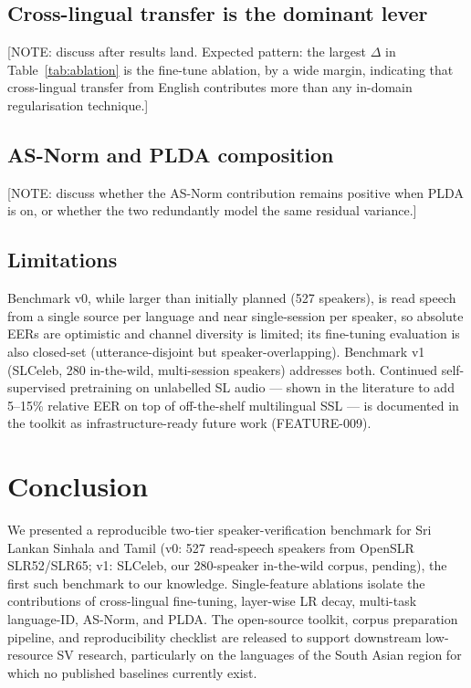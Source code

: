 \documentclass[11pt,a4paper]{article}
\begin{document}
\subsection{Cross-lingual transfer is the dominant lever}

[NOTE: discuss after results land. Expected pattern: the largest
$\Delta$ in Table~\ref{tab:ablation} is the fine-tune ablation, by
a wide margin, indicating that cross-lingual transfer from English
contributes more than any in-domain regularisation technique.]

\subsection{AS-Norm and PLDA composition}

[NOTE: discuss whether the AS-Norm contribution remains positive
when PLDA is on, or whether the two redundantly model the same
residual variance.]

\subsection{Limitations}

Benchmark v0, while larger than initially planned (527 speakers), is
read speech from a single source per language and near single-session
per speaker, so absolute EERs are optimistic and channel diversity is
limited; its fine-tuning evaluation is also closed-set
(utterance-disjoint but speaker-overlapping). Benchmark v1 (SLCeleb,
280 in-the-wild, multi-session speakers) addresses both. Continued self-supervised
pretraining on unlabelled SL audio --- shown in the literature to add
5--15\% relative EER on top of off-the-shelf multilingual SSL ---
is documented in the toolkit as infrastructure-ready future work
(FEATURE-009).

\section{Conclusion}
\label{sec:conclusion}

We presented a reproducible two-tier speaker-verification benchmark
for Sri Lankan Sinhala and Tamil (v0: 527 read-speech speakers from
OpenSLR SLR52/SLR65; v1: SLCeleb, our 280-speaker in-the-wild corpus,
pending), the first such benchmark to our knowledge. Single-feature ablations isolate the contributions of
cross-lingual fine-tuning, layer-wise LR decay, multi-task
language-ID, AS-Norm, and PLDA. The open-source toolkit, corpus
preparation pipeline, and reproducibility checklist are released to
support downstream low-resource SV research, particularly on the
languages of the South Asian region for which no published baselines
currently exist.
\end{document}
